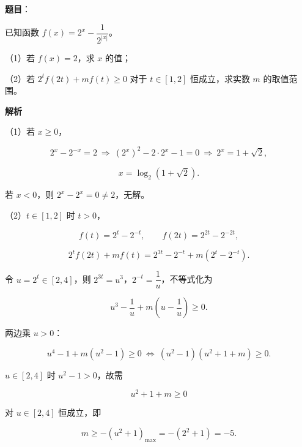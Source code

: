\begin{answer}

\textbf{题目}：

已知函数 $f(x)=2^x-\dfrac1{2^{|x|}}$。

（1）若 $f(x)=2$，求 $x$ 的值；

（2）若 $2^tf(2t)+mf(t)\geqslant0$ 对于 $t\in[1,2]$ 恒成立，求实数 $m$ 的取值范围。

\textbf{解析}

（1）若 $x\geqslant0$，

\nopagebreak[4]
\[2^x-2^{-x}=2\ \Longrightarrow\ (2^x)^2-2\cdot2^x-1=0\ \Longrightarrow\ 2^x=1+\sqrt2,\]

\nopagebreak[4]
\[x=\log_2(1+\sqrt2).\]

若 $x<0$，则 $2^x-2^{x}=0\neq2$，无解。

（2）$t\in[1,2]$ 时 $t>0$，

\nopagebreak[4]
\[f(t)=2^t-2^{-t},\qquad f(2t)=2^{2t}-2^{-2t},\]

\nopagebreak[4]
\[2^tf(2t)+mf(t)=2^{3t}-2^{-t}+m\left(2^t-2^{-t}\right).\]

令 $u=2^t\in[2,4]$，则 $2^{3t}=u^3$，$2^{-t}=\dfrac1u$，不等式化为

\nopagebreak[4]
\[u^3-\frac1u+m\left(u-\frac1u\right)\geqslant0.\]

两边乘 $u>0$：

\nopagebreak[4]
\[u^4-1+m(u^2-1)\geqslant0
\ \Longleftrightarrow\ (u^2-1)(u^2+1+m)\geqslant0.\]

$u\in[2,4]$ 时 $u^2-1>0$，故需

\nopagebreak[4]
\[u^2+1+m\geqslant0\]

对 $u\in[2,4]$ 恒成立，即

\nopagebreak[4]
\[m\geqslant-\left(u^2+1\right)_{\max}=-(2^2+1)=-5.\]


\end{answer}
